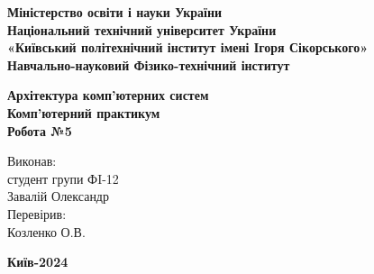 \documentclass[a4paper,12pt]{article}
\begin{document}
    \pagestyle{fancy}
    \fancyhead{}
    \begin{center}
        \large{\textbf{Міністерство освіти і науки України\\
                Національний технічний університет України\\
                «Київський політехнічний інститут імені Ігоря Сікорського»\\
                Навчально-науковий Фізико-технічний інститут}}\\
        \hfill \break \hfill \break \hfill\break \hfill \break \hfill \break \hfill \break \hfill \break
        \hfill \break \hfill \break \hfill \break
        \begin{center}
            \normalsize{\textbf{Архітектура комп'ютерних систем\\
            Комп’ютерний практикум\\
            Робота №5}}
        \end{center}
    \end{center}
    \hfill \break \hfill \break \hfill \break \hfill \break \hfill \break \hfill \break \hfill \break
    \hfill \break \hfill \break \hfill \break \hfill \break 
    \begin{flushright}
        \large{ \hspace{35pt} Виконав:\\
            студент групи ФI-12\\
            Завалій Олександр\\} 
        \large{ \hspace{35pt} Перевірив:\\
        Козленко О.В.} 
    \end{flushright}
    \hfill \break \hfill \break \hfill \break \hfill \break \hfill \break \hfill \break \hfill \break
    \hfill \break
    \begin{center} \textbf{Київ-2024} \end{center}
    \thispagestyle{empty}
\end{document}
